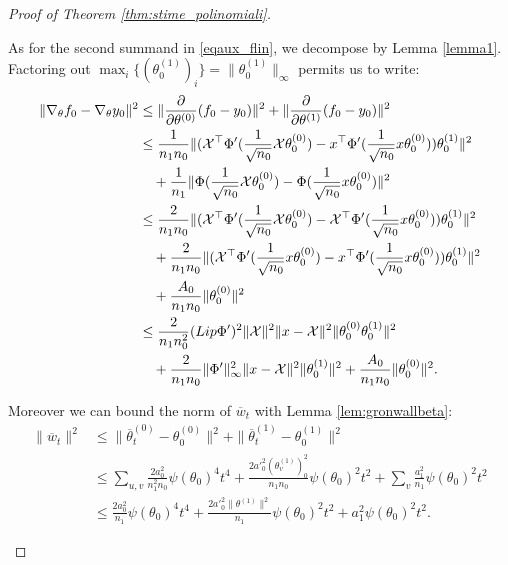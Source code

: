 \documentclass[10pt,a4paper]{amsart}
\newcommand{\X}{\mathcal{X}}
\newcommand{\norm}[2]{
    \|#1\|_{#2}
}
\newcommand{\partv}[1]{
    \frac{\partial}{\partial #1}
}
\newcommand{\s}{\psi}
\begin{document}
\begin{proof}[Proof of Theorem \ref{thm:stime_polinomiali}]
\begin{itemize}
    As for the second summand in \eqref{eqaux_flin}, we decompose by Lemma \ref{lemma1}.
    Factoring out $\max_i \{(\theta^{(1)}_0)_i\} = \norm{\theta^{(1)}_0}{\infty}$ permits us to write:
    \begin{align}
        \norm{\nabla_\theta f_0 - \nabla_\theta y_0}{}^2 &\le \norm{\partv{\theta^{(0)}}(f_0 - y_0)}{}^2+\norm{\partv{\theta^{(1)}}(f_0 - y_0)}{}^2 \\
        &\le \frac{1}{n_1n_0} \norm{(\X^\top\Phi'(\frac{1}{\sqrt{n_0}}\X\theta_0^{(0)})-x^\top\Phi'(\frac{1}{\sqrt{n_0}}x\theta_0^{(0)}))\theta_0^{(1)}}{}^2\\
        &\quad + \frac{1}{n_1}\norm{\Phi(\frac{1}{\sqrt{n_0}}\X\theta_0^{(0)})-\Phi(\frac{1}{\sqrt{n_0}}x\theta_0^{(0)})}{}^2 \\
        &\le \frac{2}{n_1n_0} \norm{(\X^\top\Phi'(\frac{1}{\sqrt{n_0}}\X\theta_0^{(0)})-\X^\top\Phi'(\frac{1}{\sqrt{n_0}}x\theta_0^{(0)}))\theta_0^{(1)}}{}^2\\
        &\quad +\frac{2}{n_1n_0} \norm{(\X^\top\Phi'(\frac{1}{\sqrt{n_0}}x\theta_0^{(0)})-x^\top\Phi'(\frac{1}{\sqrt{n_0}}x\theta_0^{(0)}))\theta_0^{(1)}}{}^2\\
        &\quad + \frac{A_0}{n_1n_0}\norm{\theta_0^{(0)}}{}^2 \\
        &\le \frac{2}{n_1n_0^2}(\textup{Lip}\Phi')^2\norm{\X}{}^2 \norm{x-\X}{}^2\norm{\theta_0^{(0)}\theta_0^{(1)}}{}^2\\
        &\quad +\frac{2}{n_1n_0} \norm{\Phi'}{\infty}^2\norm{x-\X}{}^2\norm{\theta_0^{(1)}}{}^2 + \frac{A_0}{n_1n_0}\norm{\theta_0^{(0)}}{}^2.
    \end{align}

    Moreover we can bound the norm of $\overline w_t$ with Lemma \ref{lem:gronwallbeta}:
    \begin{align}
        \label{eqaux_flinaux2}
        \norm{\overline w_t}{}^2 &\le \norm{\overline \theta_t^{(0)}-\theta_0^{(0)}}{}^2 + \norm{\overline \theta_t^{(1)}-\theta_0^{(1)}}{}^2 \\
        &\le \sum_{u,v}\frac{2a_0^2}{n_1^2n_0}\s(\theta_0)^4t^4 + \frac{2{a'}^2_0(\theta^{(1)}_v)^2_0}{n_1n_0}\s(\theta_0)^2t^2+ \sum_{v} \frac{a_1^2}{n_1}\s(\theta_0)^2t^2\\
        &\le \frac{2a_0^2}{n_1}\s(\theta_0)^4t^4 + \frac{2{a'}^2_0\norm{\theta^{(1)}}{}^2}{n_1}\s(\theta_0)^2t^2+ a_1^2\s(\theta_0)^2t^2.
    \end{align}


\end{itemize}
\end{proof}
\end{document}
